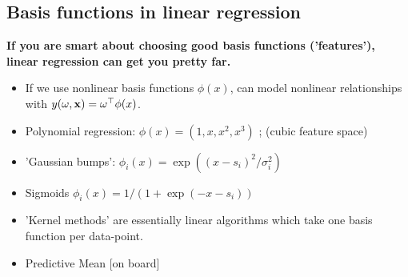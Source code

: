 \subsection{Basis functions in linear regression}
\textbf{If you are smart about choosing good basis functions ('features'), linear regression can get you pretty far.}
\begin{itemize}
\item If we use nonlinear basis functions $\phi(x)$, can model nonlinear relationships with $y(\omega, {\mathbf{x}})= \omega^\top \phi(x)$.
\item Polynomial regression: $\phi(x)=(1,x,x^2,x^3)$ ; (cubic feature space) 
\item 'Gaussian bumps': $\phi_i(x)= \exp\left((x-s_i)^2/\sigma_i^2 \right)$
\item Sigmoids $\phi_i(x)=1/(1+\exp(-x-s_i))$
\item  'Kernel methods' are essentially linear algorithms which take one basis function per data-point.
\item Predictive Mean [on board]
\end{itemize}

